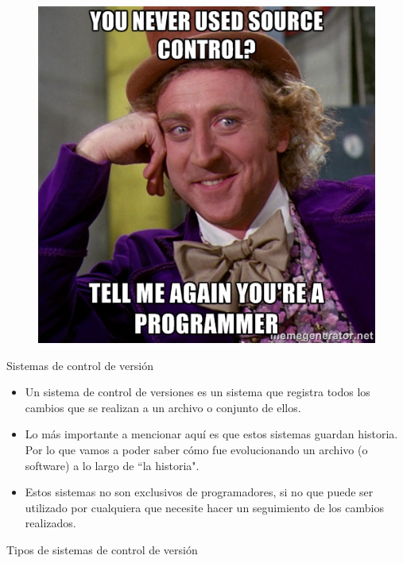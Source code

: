 \documentclass{beamer}
\begin{document}
\begin{frame}
	\begin{figure}
		\centering
		\includegraphics[width=0.7\linewidth]{img/notaprogramer.jpg}
		\label{fig:notaprogrammer}
	\end{figure}
\end{frame}

\begin{frame}{Sistemas de control de versión}
	\begin{itemize}
		\item Un sistema de control de versiones es un sistema que registra todos los cambios
		que se realizan a un archivo o conjunto de ellos.
		\item Lo más importante a mencionar aquí es que estos sistemas guardan historia. Por lo que
		vamos a poder saber cómo fue evolucionando un archivo (o software) a lo largo de ``la historia".
		\item Estos sistemas no son exclusivos de programadores, si no que puede ser utilizado
		por cualquiera que necesite hacer un seguimiento de los cambios realizados.
	\end{itemize}	
\end{frame}

\begin{frame}
   \Huge Tipos de sistemas de control de versión
\end{frame}
\end{document}
